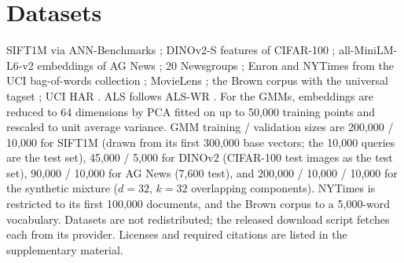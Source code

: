\documentclass[10pt]{article}
\begin{document}
\section{Datasets}\label{app:data}
SIFT1M \citep{jegou2011pq} via ANN-Benchmarks \citep{aumuller2020ann}; DINOv2-S features \citep{oquab2024dinov2} of
CIFAR-100 \citep{krizhevsky2009learning}; all-MiniLM-L6-v2 embeddings \citep{reimers2019sbert,wang2020minilm} of AG
News \citep{zhang2015character}; 20 Newsgroups \citep{lang1995newsweeder}; Enron and NYTimes from the UCI
bag-of-words collection \citep{newman2008bow}; MovieLens \citep{harper2015movielens}; the Brown corpus
\citep{francis1979brown} with the universal tagset \citep{petrov2012universal}; UCI HAR \citep{anguita2013har}. ALS
follows ALS-WR \citep{zhou2008netflix}. For the GMMs, embeddings are reduced to 64 dimensions by PCA fitted on up to
50,000 training points and rescaled to unit average variance. GMM training / validation sizes are 200,000 / 10,000
for SIFT1M (drawn from its first 300,000 base vectors; the 10,000 queries are the test set), 45,000 / 5,000 for
DINOv2 (CIFAR-100 test images as the test set), 90,000 / 10,000 for AG News (7,600 test), and 200,000 / 10,000 /
10,000 for the synthetic mixture ($d = 32$, $k = 32$ overlapping components). NYTimes is restricted to its first
100,000 documents, and the Brown corpus to a 5,000-word vocabulary. Datasets are not redistributed; the released download script fetches each from its provider. Licenses and required
citations are listed in the supplementary material.
\end{document}
